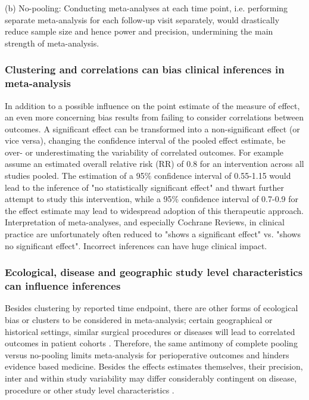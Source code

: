\documentclass[11pt,notitlepage]{article}
\begin{document}
(b) No-pooling: 
Conducting meta-analyses at each time point, i.e. performing separate meta-analysis 
for each follow-up visit separately, would drastically reduce sample size and hence 
power and precision, undermining the main strength of meta-analysis.

\subsubsection*{Clustering and correlations can bias clinical inferences in meta-analysis }
In addition to a possible influence on the point estimate of the measure of effect, 
an even more concerning bias results from failing to consider correlations 
between outcomes. A significant effect can be transformed into a non-significant 
effect (or vice versa), changing the confidence interval of the pooled effect 
estimate, be over- or underestimating the variability of correlated outcomes. 
For example assume an estimated overall relative risk (RR) of 0.8 for an 
intervention across all studies pooled. The estimation of a 95\% confidence 
interval of 0.55-1.15 would lead to the inference of "no statistically 
significant effect" and thwart further attempt to study this intervention, 
while a 95\% confidence interval of 0.7-0.9 for the effect estimate may 
lead to widespread adoption of this therapeutic approach. Interpretation 
of meta-analyses, and especially Cochrane Reviews, in clinical practice 
are unfortunately often reduced to "shows a significant effect" vs. "shows 
no significant effect". Incorrect inferences can have huge clinical impact.

\subsubsection*{Ecological, disease and geographic study level characteristics can influence inferences}
Besides clustering by reported time endpoint, there are other forms of ecological bias or clusters to be considered in meta-analysis; certain geographical or historical settings, similar surgical procedures or diseases will lead to correlated outcomes in patient cohorts \cite{Abroug2011,Andreae2013,Andreae2015,Roth2015CriticalCare}. Therefore, the same antimony of complete pooling versus no-pooling limits meta-analysis for perioperative outcomes and hinders evidence based medicine. Besides the effects estimates themselves, their precision, inter and within study variability may differ considerably contingent on disease, procedure or other study level characteristics \cite{Andreae2013,Andreae2015,Roth2015CriticalCare}.
\end{document}
